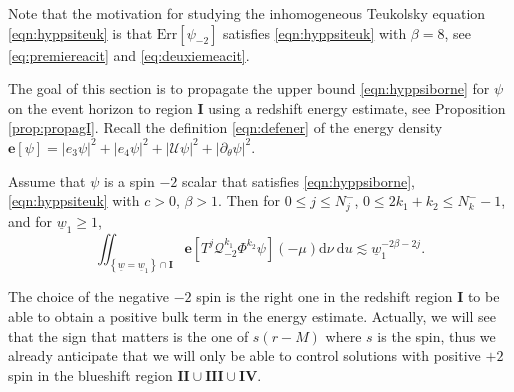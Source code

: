 \documentclass[reqno]{amsart}
\numberwithin{equation}{section}
\newcommand{\quatre}{\mathbf{IV}}
\newcommand{\mcq}{\mathcal{Q}}
\newcommand{\wbar}{\underline{w}}
\newcommand{\errm}{\mathrm{Err}[\Psim]}
\newcommand{\dee}{\mathrm{d}}
\newcommand{\ener}{\mathbf{e}}
\newcommand{\un}{\mathbf{I}}
\newcommand{\deux}{\mathbf{II}}
\newcommand{\trois}{\mathbf{III}}
\newcommand{\Psim}{\psi_{-2}}
\theoremstyle{plain}
\theoremstyle{definition}
\theoremstyle{remark}
\numberwithin{equation}{section}
\begin{document}
{\begin{rem}Note that the motivation for studying the inhomogeneous Teukolsky equation \eqref{eqn:hyppsiteuk} is that $\errm$ satisfies \eqref{eqn:hyppsiteuk} with $\beta=8$, see \eqref{eq:premiereacit} and \eqref{eq:deuxiemeacit}.
\end{rem}
}
The goal of this section is to propagate the upper bound \eqref{eqn:hyppsiborne} for $\psi$ on the event horizon to region $\un$ using a redshift energy estimate, see Proposition \ref{prop:propagI}. Recall the definition \eqref{eqn:defener} of the energy density $\ener[\psi]=|e_3\psi|^2+|e_4\psi|^2+|\mathcal{U}\psi|^2+|\partial_\theta\psi|^2$.
\begin{prop}\label{prop:ener}
    Assume that $\psi$ is a spin $-2$ scalar that satisfies \eqref{eqn:hyppsiborne}, \eqref{eqn:hyppsiteuk} with $c>0$, $\beta>1$. Then for $0\leq j\leq N_j^-$, $0\leq 2 k_1+k_2\leq N_k^--1$, and for $\wbar_1\geq 1$,
    $$\iint_{\left\{\underline{w}=\underline{w}_1\right\} \cap \mathbf{I}} \mathbf{e}[T^j\mcq_{-2}^{k_1}\Phi^{k_2}\psi](-\mu) \dee\nu\:\dee u\lesssim\wbar_1^{-2\beta-2j}.$$
\end{prop}
\begin{rem}
    The choice of the negative $-2$ spin is the right one in the redshift region $\mathbf{I}$ to be able to obtain a positive bulk term in the energy estimate. Actually, we will see that the sign that matters is the one of $s(r-M)$ where $s$ is the spin, thus we already anticipate that we will only be able to control solutions with positive $+2$ spin in the blueshift region $\deux\cup\trois\cup\quatre$.
\end{rem}
\end{document}
